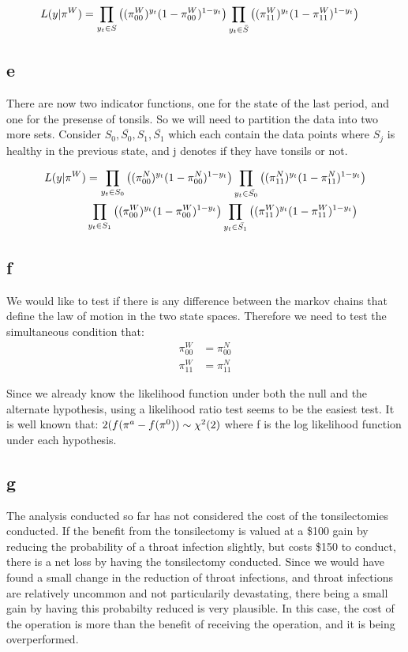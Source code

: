 \documentclass[11pt]{article}
\begin{document}
\begin{align*}
L( y | \bold{\pi}^W ) &= \prod_{y_t \in S} \left ((\pi_{00}^W)^{y_t} (1 - \pi_{00}^W)^{1-y_t} \right
) \prod_{y_t \in
\bar{S}} \left ( (\pi_{11}^W)^{y_t} (1-\pi_{11}^W)^{1-y_t}  \right)
\end{align*}

\subsection{e}
\label{sec-1-5}
There are now two indicator functions, one for the state of the last
period, and one for the presense of tonsils. So we will need to
partition the data into two more sets. Consider $S_0 , \bar{S_0}, S_1,
\bar{S_1}$ which each contain the data points where $S_j$ is healthy
in the previous state, and j denotes if they have tonsils or not.

\begin{align*}
L( y | \bold{\pi}^W ) &= \prod_{y_t \in S_0} \left ((\pi_{00}^N)^{y_t} (1 - \pi_{00}^N)^{1-y_t} \right
) \prod_{y_t \in \bar{S_0}} \left ( (\pi_{11}^N)^{y_t} (1-\pi_{11}^N)^{1-y_t}  \right)\\ &\prod_{y_t \in S_1} \left ((\pi_{00}^W)^{y_t} (1 - \pi_{00}^W)^{1-y_t} \right
) \prod_{y_t \in \bar{S_1} } \left ( (\pi_{11}^W)^{y_t} (1-\pi_{11}^W)^{1-y_t}  \right)
\end{align*}

\subsection{f}
\label{sec-1-6}
We would like to test if there is any difference between the markov
chains that define the law of motion in the two state
spaces. Therefore we need to test the simultaneous condition that: 
\begin{align*}
\pi_{00}^W &= \pi_{00}^N \\
\pi_{11}^W &= \pi_{11}^N
\end{align*}

Since we already know the likelihood function under both the null and
the alternate hypothesis, using a likelihood ratio test seems to be
the easiest test. It is well known that: $2( f( \bold{\pi}^a -
f(\bold{\pi}^0 ) ) \sim \chi^2 ( 2 )$ where f is the log likelihood function
under each hypothesis.

\subsection{g}
\label{sec-1-7}
The analysis conducted so far has not considered the cost of the
tonsilectomies conducted. If the benefit from the tonsilectomy is
valued at a \$100 gain by reducing the probability of a throat
infection slightly, but costs \$150 to conduct, there is a net loss by
having the tonsilectomy conducted. Since we would have found a small
change in the reduction of throat infections, and throat infections
are relatively uncommon and not particularily devastating, there being
a small gain by having this probabilty reduced is very plausible. In
this case, the cost of the operation is more than the benefit of
receiving the operation, and it is being overperformed.
\end{document}
